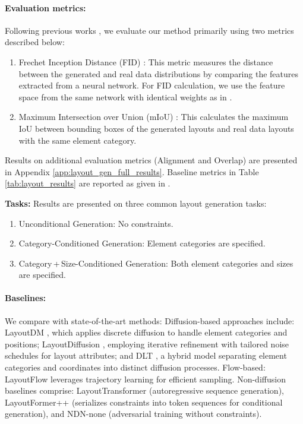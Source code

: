 \paragraph{Evaluation metrics:}
\label{par:layout_gen_eval_metrics}
Following previous works \cite{inoue2023layoutdm, chen2024towards}, we evaluate our method primarily using two metrics described below:
\begin{enumerate}[noitemsep,topsep=0pt]
    \item Frechet Inception Distance (FID) \cite{heusel2017gans}: This metric measures the distance between the generated and real data distributions by comparing the features extracted from a neural network. For FID calculation, we use the feature space from the same network with identical weights as in \cite{zhang2023layoutdiffusion}.
    \item Maximum Intersection over Union (mIoU) \cite{kikuchi2021constrained}: This calculates the maximum IoU between bounding boxes of the generated layouts and real data layouts with the same element category. 
\end{enumerate}
Results on additional evaluation metrics (Alignment and Overlap) are presented in Appendix \ref{app:layout_gen_full_results}. Baseline metrics in Table \ref{tab:layout_results} are reported as given in \cite{guerreiro2025layoutflow}.

\textbf{{Tasks:}}
Results are presented on three common layout generation tasks:
\begin{enumerate}[noitemsep,topsep=0pt]
    \item Unconditional Generation: No constraints.
    \item Category-Conditioned Generation: Element categories are specified.
    \item Category\,+\,Size-Conditioned Generation: Both element categories and sizes are specified.
\end{enumerate}



\paragraph{Baselines:}
We compare with state-of-the-art methods: Diffusion-based approaches include: LayoutDM \cite{inoue2023layoutdm}, which applies discrete diffusion to handle element categories and positions; LayoutDiffusion \cite{zhang2023layoutdiffusion}, employing iterative refinement with tailored noise schedules for layout attributes; and DLT \cite{levi2023dlt}, a hybrid model separating element categories and coordinates into distinct diffusion processes. Flow-based: LayoutFlow \cite{guerreiro2025layoutflow} leverages trajectory learning for efficient sampling. Non-diffusion baselines comprise: LayoutTransformer \cite{gupta2021layouttransformer} (autoregressive sequence generation), LayoutFormer++ \cite{jiang2023layoutformer++} (serializes constraints into token sequences for conditional generation), and NDN-none \cite{lee2020neural} (adversarial training without constraints).


